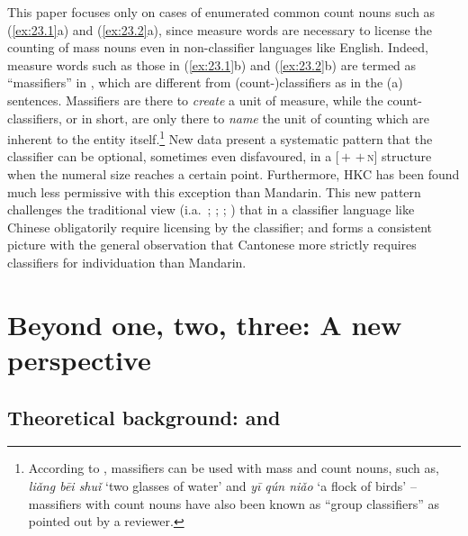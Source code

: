 \documentclass[output=paper]{langsci/langscibook}
\begin{document}
This paper focuses only on cases of enumerated common count nouns such as
(\ref{ex:23.1}a) and (\ref{ex:23.2}a), since measure words are
necessary to license the counting of mass nouns even in non-classifier
languages like English. Indeed, measure words such as those in
(\ref{ex:23.1}b) and (\ref{ex:23.2}b) are termed as
\enquote{massifiers} in \citet{ChengSybesma1998}, which are different from
(count-)classifiers as in the (a) sentences.  Massifiers are there to
\emph{create} a unit of measure, while the count-classifiers, or
 in short, are only there to \emph{name} the unit of counting
which are inherent to the entity itself.\footnote{According to
    \textcite{ChengSybesma1998}, massifiers can be used with mass and count
    nouns, such as, \emph{liǎng bēi shuǐ} \enquote*{two glasses of water} and
    \emph{yī qún niǎo} \enquote*{a flock of birds} -- massifiers with count
nouns have also been known as \enquote{group classifiers} as pointed out by a
reviewer.} New data present a systematic pattern that the
classifier can be optional, sometimes even disfavoured, in a
[\Num{}\,$+$\,\Clf{}\,$+$\,\textsc{n}] structure when the numeral size
reaches a certain point. Furthermore, \gls{HKC} has
been found much less permissive with this exception than Mandarin.
This new pattern challenges the traditional view (i.a.~\citealt{Krifka1995};
\citealt{Chierchia1998};
\citealt{ChengSybesma1999,ChengSybesma2005,ChengSybesma2012};
\citealt{Doetjes1996}) that  in a classifier
language like Chinese obligatorily require licensing by the
classifier; and forms a consistent picture with the general
observation that Cantonese more strictly requires classifiers for individuation
than Mandarin.

\section{Beyond one, two, three: A new perspective}

\subsection{Theoretical background: \citet{Krifka1995} and \citet{Chierchia1998}}
\end{document}
